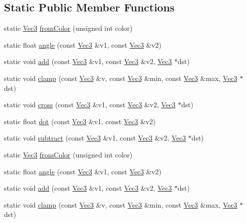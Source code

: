 \subsection*{Static Public Member Functions}
\begin{DoxyCompactItemize}
\item 
static \hyperlink{classVec3}{Vec3} \hyperlink{classVec3_a043654e34120901b9055887ceee8e71e}{from\+Color} (unsigned int color)
\item 
static float \hyperlink{classVec3_a9172074a1ea39aee0863c1627a590d7b}{angle} (const \hyperlink{classVec3}{Vec3} \&v1, const \hyperlink{classVec3}{Vec3} \&v2)
\item 
static void \hyperlink{classVec3_a7c8f72c8bbe91cba267572486e6af2b9}{add} (const \hyperlink{classVec3}{Vec3} \&v1, const \hyperlink{classVec3}{Vec3} \&v2, \hyperlink{classVec3}{Vec3} $\ast$dst)
\item 
static void \hyperlink{classVec3_a70e3ddc241d07486df20d9503702e0cf}{clamp} (const \hyperlink{classVec3}{Vec3} \&v, const \hyperlink{classVec3}{Vec3} \&min, const \hyperlink{classVec3}{Vec3} \&max, \hyperlink{classVec3}{Vec3} $\ast$dst)
\item 
static void \hyperlink{classVec3_accb3e913c94504181b252c6a1b5b419a}{cross} (const \hyperlink{classVec3}{Vec3} \&v1, const \hyperlink{classVec3}{Vec3} \&v2, \hyperlink{classVec3}{Vec3} $\ast$dst)
\item 
static float \hyperlink{classVec3_a6c8d2f9c5d8f05cb7c36bb19202464b0}{dot} (const \hyperlink{classVec3}{Vec3} \&v1, const \hyperlink{classVec3}{Vec3} \&v2)
\item 
static void \hyperlink{classVec3_a318ce54f9eb1ea3327c167736ae6fb2f}{subtract} (const \hyperlink{classVec3}{Vec3} \&v1, const \hyperlink{classVec3}{Vec3} \&v2, \hyperlink{classVec3}{Vec3} $\ast$dst)
\item 
static \hyperlink{classVec3}{Vec3} \hyperlink{classVec3_a69e69924eba8d6421ef87aaacfd3e6c2}{from\+Color} (unsigned int color)
\item 
static float \hyperlink{classVec3_a29d556e3c296f51e761674b66e050e1c}{angle} (const \hyperlink{classVec3}{Vec3} \&v1, const \hyperlink{classVec3}{Vec3} \&v2)
\item 
static void \hyperlink{classVec3_ab8a89c4ce543bc16b7c4e5a9f276fd5e}{add} (const \hyperlink{classVec3}{Vec3} \&v1, const \hyperlink{classVec3}{Vec3} \&v2, \hyperlink{classVec3}{Vec3} $\ast$dst)
\item 
static void \hyperlink{classVec3_a4ffe590371d220d2870aa99ebb39bccc}{clamp} (const \hyperlink{classVec3}{Vec3} \&v, const \hyperlink{classVec3}{Vec3} \&min, const \hyperlink{classVec3}{Vec3} \&max, \hyperlink{classVec3}{Vec3} $\ast$dst)

\end{DoxyCompactItemize}
